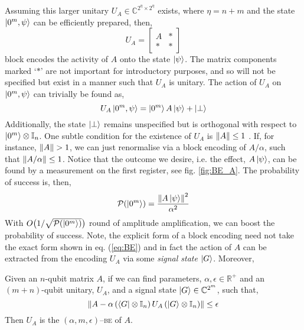 \documentclass{article}
\begin{document}
Assuming this larger unitary $U_A\in\mathbb{C}^{2^\eta\times 2^\eta}$ exists, where $\eta = n+m$ and the state $\ket{0^m,\psi}$ can be efficiently prepared, then,
\begin{equation}\label{eq:BE}
    U_A = \begin{bmatrix}A & * \\ * & *\end{bmatrix}
\end{equation}
block encodes the activity of $A$ onto the state $\ket{\psi}$. The matrix components marked `$*$' are not important for introductory purposes, and so will not be specified but exist in a manner such that $U_A$ is unitary. The action of $U_A$ on $\ket{0^m,\psi}$ can trivially be found as,
\begin{equation}\label{eq:BE_states}
    U_A\ket{0^m,\psi} = \ket{0^m}A\ket{\psi} + \ket{\perp}
\end{equation}
Additionally, the state $\ket{\perp}$ remains unspecified but is orthogonal with respect to $\ket{0^m}\otimes \mathbb{I}_n$. One subtle condition for the existence of $U_A$ is $\norm{A}\leq 1$ \cite{CLBY23}. If, for instance, $\norm{A}>1$, we can just renormalise via a block encoding of $A/\alpha$, such that $\norm{A/\alpha}\leq 1$. Notice that the outcome we desire, i.e. the effect, $A\ket{\psi}$, can be found by a measurement on the first register, see fig. \ref{fig:BE_A}. The probability of success is, then,
\begin{equation}
    \mathcal{P}(\ket{0^m}) = \frac{\norm{A\ket{\psi}}^2}{\alpha^2}
\end{equation}
With $O\big(1/\sqrt{\mathcal{P}(\ket{0^m})}\big)$ round of amplitude amplification, we can boost the probability of success. Note, the explicit form of a block encoding need not take the exact form shown in eq. (\ref{eq:BE}) and in fact the action of $A$ can be extracted from the encoding $U_A$ via some \emph{signal state} $\ket{G}$. Moreover,
\begin{defn}{\textnormal{\cite{LinLin22,LC19}}}

    \noindent Given an $n$-qubit matrix $A$, if we can find parameters, $\alpha, \epsilon \in \mathbb{R}^+$ and an $(m+n)$-qubit unitary, $U_A$, and a signal state $\ket{G}\in\mathbb{C}^{2^m}$, such that, 
    \begin{equation}
    \norm{A - \alpha \left(\bra{G}\otimes\mathbb{I}_n\right)U_A\left(\ket{G}\otimes\mathbb{I}_n\right)} \leq \epsilon
    \end{equation}
    Then $U_A$ is the $(\alpha, m, \epsilon)$--\textsc{be} of $A$.
\end{defn}
\end{document}
